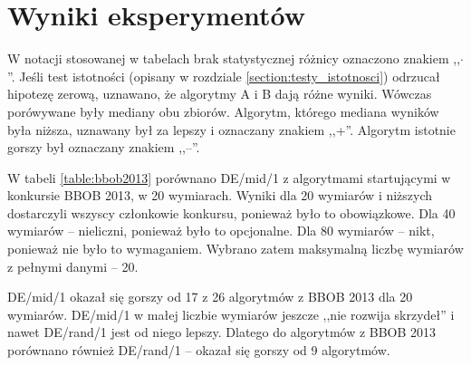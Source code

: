 \documentclass[a4paper,onecolumn,oneside,12pt,wide,floatssmall]{mwrep}
\theoremstyle{definition}
\theoremstyle{plain}%
\theoremstyle{remark}
\begin{document}
\chapter{Wyniki eksperymentów}

W notacji stosowanej w tabelach brak statystycznej różnicy oznaczono znakiem ,,$\cdotp$''.
Jeśli test istotności (opisany w rozdziale \ref{section:testy_istotnosci})
odrzucał hipotezę zerową, uznawano, że algorytmy A i B dają różne wyniki.
Wówczas porówywane były mediany obu zbiorów. Algorytm, którego mediana wyników była niższa,
uznawany był za lepszy i oznaczany znakiem ,,+''. Algorytm istotnie gorszy był oznaczany znakiem ,,--''.

W tabeli \ref{table:bbob2013} porównano DE/mid/1 z algorytmami startującymi w konkursie BBOB 2013, w 20 wymiarach.
Wyniki dla 20 wymiarów i niższych dostarczyli wszyscy członkowie konkursu, ponieważ było to obowiązkowe. 
Dla 40 wymiarów -- nieliczni, ponieważ było to opcjonalne.
Dla 80 wymiarów -- nikt, ponieważ nie było to wymaganiem.
Wybrano zatem maksymalną liczbę wymiarów z pełnymi danymi -- 20.

DE/mid/1 okazał się gorszy od 17 z 26 algorytmów z BBOB 2013 dla 20 wymiarów. DE/mid/1 w małej liczbie wymiarów
jeszcze ,,nie rozwija skrzydeł'' i nawet DE/rand/1 jest od niego lepszy. Dlatego do algorytmów z BBOB 2013 porównano również
DE/rand/1 -- okazał się gorszy od 9 algorytmów.
\end{document}
